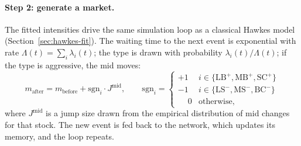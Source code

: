 \paragraph{Step 2: generate a market.} The fitted intensities drive the same simulation loop as a classical
Hawkes model (Section~\ref{sec:hawkes-fit}). The waiting time to the next event is exponential with rate
$\Lambda(t) = \sum_i \lambda_i(t)$; the type is drawn with probability $\lambda_i(t)/\Lambda(t)$; if the type is
aggressive, the mid moves:
\begin{equation}
m_{\text{after}} = m_{\text{before}} + \mathrm{sgn}_i \cdot J^{\text{mid}},
\qquad \mathrm{sgn}_i = \begin{cases} +1 & i \in \{\text{LB}^{+}, \text{MB}^{+}, \text{SC}^{+}\}\\
-1 & i \in \{\text{LS}^{-}, \text{MS}^{-}, \text{BC}^{-}\}\\ \phantom{+}0 & \text{otherwise,}\end{cases}
\label{eq:lalor-mid}
\end{equation}
where $J^{\text{mid}}$ is a jump size drawn from the empirical distribution of mid changes for that stock.
The new event is fed back to the network, which updates its memory, and the loop repeats.

